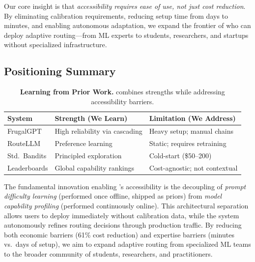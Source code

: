 Our core insight is that \emph{accessibility requires ease of use, not just cost reduction}. By eliminating calibration requirements, reducing setup time from days to minutes, and enabling autonomous adaptation, we expand the frontier of who can deploy adaptive routing---from ML experts to students, researchers, and startups without specialized infrastructure.

\subsection{Positioning Summary}

\begin{table}[t]
\centering
\footnotesize
\caption{\textbf{Learning from Prior Work.} \ours{} combines strengths while addressing accessibility barriers.}
\label{tab:related_comparison}
\begin{tabular}{p{2.2cm}p{2.4cm}p{2.4cm}}
\toprule
\textbf{System} & \textbf{Strength (We Learn)} & \textbf{Limitation (We Address)} \\
\midrule
FrugalGPT & High reliability via cascading & Heavy setup; manual chains \\
RouteLLM & Preference learning & Static; requires retraining \\
Std.\ Bandits & Principled exploration & Cold-start (\$50--200) \\
Leaderboards & Global capability rankings & Cost-agnostic; not contextual \\
\bottomrule
\end{tabular}
\end{table}

The fundamental innovation enabling \ours{}'s accessibility is the decoupling of \emph{prompt difficulty learning} (performed once offline, shipped as priors) from \emph{model capability profiling} (performed continuously online). This architectural separation allows users to deploy immediately without calibration data, while the system autonomously refines routing decisions through production traffic. By reducing both economic barriers (61\% cost reduction) and expertise barriers (minutes vs.\ days of setup), we aim to expand adaptive routing from specialized ML teams to the broader community of students, researchers, and practitioners.

